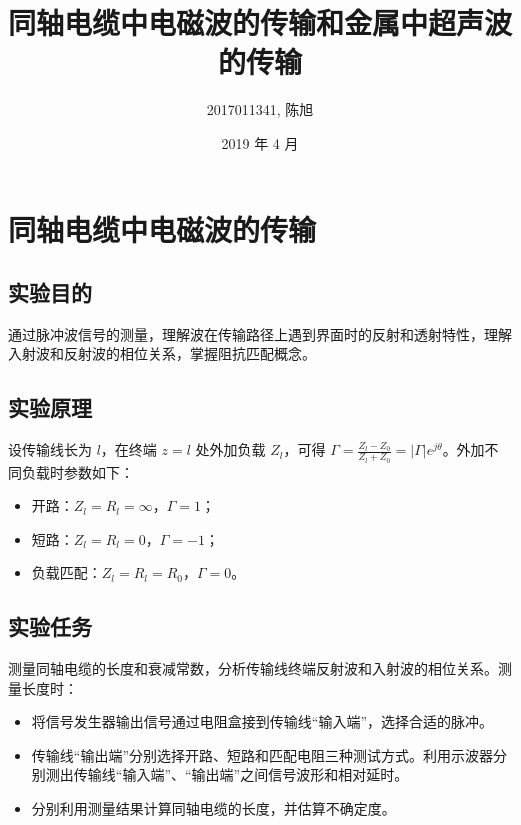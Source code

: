 \documentclass[a4paper]{article}
\title{同轴电缆中电磁波的传输和金属中超声波的传输}
\author{2017011341, 陈旭}
\date{2019 年 4 月}
\begin{document}
\maketitle

\section{同轴电缆中电磁波的传输}

    \subsection{实验目的}

        \par 通过脉冲波信号的测量，理解波在传输路径上遇到界面时的反射和透射特性，理解入射波和反射波的相位关系，掌握阻抗匹配概念。

    \subsection{实验原理}

        \par 设传输线长为 $l$，在终端 $z=l$ 处外加负载 $Z_l$，可得 $\Gamma=\frac{Z_l-Z_0}{Z_l+Z_0}=|\Gamma|e^{j\theta}$。外加不同负载时参数如下：

        \begin{itemize}
            \item 开路：$Z_l=R_l=\infty$，$\Gamma = 1$；
            \item 短路：$Z_l=R_l=0$，$\Gamma = -1$；
            \item 负载匹配：$Z_l=R_l=R_0$，$\Gamma = 0$。
        \end{itemize}
    
    \subsection{实验任务}

        \par 测量同轴电缆的长度和衰减常数，分析传输线终端反射波和入射波的相位关系。测量长度时：
        \begin{itemize}
            \item 将信号发生器输出信号通过电阻盒接到传输线“输入端”，选择合适的脉冲。
            \item 传输线“输出端”分别选择开路、短路和匹配电阻三种测试方式。利用示波器分别测出传输线“输入端”、“输出端”之间信号波形和相对延时。
            \item 分别利用测量结果计算同轴电缆的长度，并估算不确定度。
            
        \end{itemize}
\end{document}

